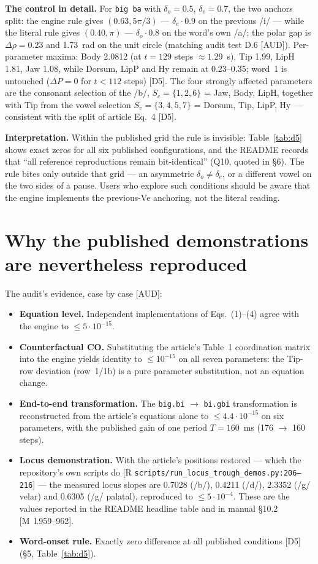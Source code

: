 \documentclass[11pt,letterpaper]{article}
\newcommand{\code}[1]{\texttt{#1}}
\begin{document}
\textbf{The control in detail.} For \code{big\,ba} with $\delta_o = 0.5$,
$\delta_e = 0.7$, the two anchors split: the engine rule gives $(0.63,
5\pi/3)$ --- $\delta_e \cdot 0.9$ on the previous /i/ --- while the literal
rule gives $(0.40, \pi)$ --- $\delta_o \cdot 0.8$ on the word's own /a/; the
polar gap is $\Delta\rho = 0.23$ and 1.73~rad on the unit circle (matching
audit test D.6 \hbox{[AUD]}). Per-parameter maxima: Body 2.0812 (at
$t = 129$ steps $\approx 1.29$~s), Tip 1.99, LipH 1.81, Jaw 1.08, while
Dorsum, LipP and Hy remain at 0.23--0.35; word~1 is untouched
($\Delta P = 0$ for $t < 112$ steps) \hbox{[D5]}. The four strongly affected
parameters are the consonant selection of the /b/, $S_c = \{1,2,6\}$ = Jaw,
Body, LipH, together with Tip from the vowel selection $S_v = \{3,4,5,7\}$ =
Dorsum, Tip, LipP, Hy --- consistent with the split of article Eq.~4
\hbox{[D5]}.

\textbf{Interpretation.} Within the published grid the rule is invisible:
Table~\ref{tab:d5} shows exact zeros for all six published configurations,
and the README records that ``all reference reproductions remain
bit-identical'' (Q10, quoted in \S6). The rule bites only outside that grid
--- an asymmetric $\delta_o \ne \delta_e$, or a different vowel on the two
sides of a pause. Users who explore such conditions should be aware that the
engine implements the previous-Ve anchoring, not the literal reading.

\section{Why the published demonstrations are nevertheless reproduced}

The audit's evidence, case by case \hbox{[AUD]}:
\begin{itemize}\itemsep2pt
\item \textbf{Equation level.} Independent implementations of Eqs.~(1)--(4)
agree with the engine to $\le 5\cdot10^{-15}$.
\item \textbf{Counterfactual CO.} Substituting the article's Table~1
coordination matrix into the engine yields identity to $\le 10^{-15}$ on all
seven parameters: the Tip-row deviation (row~1/1b) is a pure parameter
substitution, not an equation change.
\item \textbf{End-to-end transformation.} The \code{big.bi} $\to$
\code{bi.gbi} transformation is reconstructed from the article's equations
alone to $\le 4.4\cdot10^{-15}$ on six parameters, with the published gain of
one period $T = 160$~ms (176 $\to$ 160 steps).
\item \textbf{Locus demonstration.} With the article's positions restored
--- which the repository's own scripts do
{[R \code{scripts/}\allowbreak\code{run\_locus\_trough\_demos.py:206--216}]} --- the
measured locus slopes are 0.7028 (/b/), 0.4211 (/d/), 2.3352 (/g/ velar) and
0.6305 (/g/ palatal), reproduced to $\le 5\cdot10^{-4}$. These are the values
reported in the README headline table and in manual \S10.2
\hbox{[M l.959--962]}.
\item \textbf{Word-onset rule.} Exactly zero difference at all published
conditions \hbox{[D5]} (\S5, Table~\ref{tab:d5}).
\end{itemize}
\end{document}
